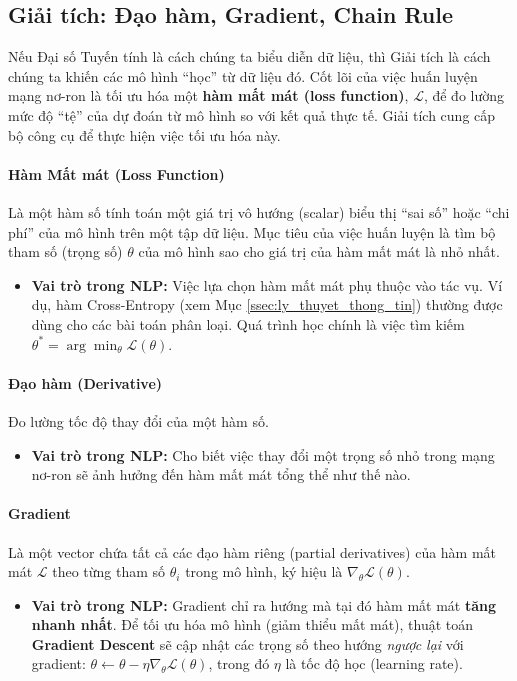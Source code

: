 \subsection{Giải tích: Đạo hàm, Gradient, Chain Rule}
\label{ssec:giai_tich}
Nếu Đại số Tuyến tính là cách chúng ta biểu diễn dữ liệu, thì Giải tích là cách chúng ta khiến các mô hình “học” từ dữ liệu đó. Cốt lõi của việc huấn luyện mạng nơ-ron là tối ưu hóa một \textbf{hàm mất mát (loss function)}, $\mathcal{L}$, để đo lường mức độ “tệ” của dự đoán từ mô hình so với kết quả thực tế. Giải tích cung cấp bộ công cụ để thực hiện việc tối ưu hóa này.

\paragraph{Hàm Mất mát (Loss Function)}
Là một hàm số tính toán một giá trị vô hướng (scalar) biểu thị “sai số” hoặc “chi phí” của mô hình trên một tập dữ liệu. Mục tiêu của việc huấn luyện là tìm bộ tham số (trọng số) $\theta$ của mô hình sao cho giá trị của hàm mất mát là nhỏ nhất.
\begin{itemize}
    \item \textbf{Vai trò trong NLP:} Việc lựa chọn hàm mất mát phụ thuộc vào tác vụ. Ví dụ, hàm Cross-Entropy (xem Mục \ref{ssec:ly_thuyet_thong_tin}) thường được dùng cho các bài toán phân loại. Quá trình học chính là việc tìm kiếm $\theta^* = \arg\min_{\theta} \mathcal{L}(\theta)$.
\end{itemize}

\paragraph{Đạo hàm (Derivative)}
Đo lường tốc độ thay đổi của một hàm số.
\begin{itemize}
    \item \textbf{Vai trò trong NLP:} Cho biết việc thay đổi một trọng số nhỏ trong mạng nơ-ron sẽ ảnh hưởng đến hàm mất mát tổng thể như thế nào.
\end{itemize}

\paragraph{Gradient}
Là một vector chứa tất cả các đạo hàm riêng (partial derivatives) của hàm mất mát $\mathcal{L}$ theo từng tham số $\theta_i$ trong mô hình, ký hiệu là $\nabla_{\theta}\mathcal{L}(\theta)$.
\begin{itemize}
    \item \textbf{Vai trò trong NLP:} Gradient chỉ ra hướng mà tại đó hàm mất mát \textbf{tăng nhanh nhất}. Để tối ưu hóa mô hình (giảm thiểu mất mát), thuật toán \textbf{Gradient Descent} sẽ cập nhật các trọng số theo hướng \textit{ngược lại} với gradient: $\theta \leftarrow \theta - \eta \nabla_{\theta}\mathcal{L}(\theta)$, trong đó $\eta$ là tốc độ học (learning rate).
\end{itemize}

